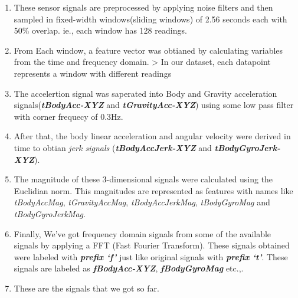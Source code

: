 \documentclass[11pt]{article}
\begin{document}
\begin{enumerate}
\def\labelenumi{\arabic{enumi}.}
\item
  These sensor signals are preprocessed by applying noise filters and
  then sampled in fixed-width windows(sliding windows) of 2.56 seconds
  each with 50\% overlap. ie., each window has 128 readings.
\item
  From Each window, a feature vector was obtianed by calculating
  variables from the time and frequency domain. \textgreater{} In our
  dataset, each datapoint represents a window with different readings
\item
  The accelertion signal was saperated into Body and Gravity
  acceleration signals(\textbf{\emph{tBodyAcc-XYZ}} and
  \textbf{\emph{tGravityAcc-XYZ}}) using some low pass filter with
  corner frequecy of 0.3Hz.
\item
  After that, the body linear acceleration and angular velocity were
  derived in time to obtian \emph{jerk signals}
  (\textbf{\emph{tBodyAccJerk-XYZ}} and
  \textbf{\emph{tBodyGyroJerk-XYZ}}).
\item
  The magnitude of these 3-dimensional signals were calculated using the
  Euclidian norm. This magnitudes are represented as features with names
  like \emph{tBodyAccMag}, \emph{tGravityAccMag},
  \emph{tBodyAccJerkMag}, \emph{tBodyGyroMag} and
  \emph{tBodyGyroJerkMag}.
\item
  Finally, We've got frequency domain signals from some of the available
  signals by applying a FFT (Fast Fourier Transform). These signals
  obtained were labeled with \textbf{\emph{prefix `f'}} just like
  original signals with \textbf{\emph{prefix `t'}}. These signals are
  labeled as \textbf{\emph{fBodyAcc-XYZ}}, \textbf{\emph{fBodyGyroMag}}
  etc.,.
\item
  These are the signals that we got so far.


\end{enumerate}
\end{document}
